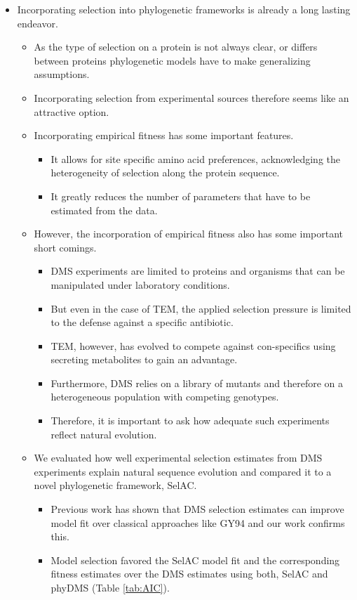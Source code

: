 \documentclass[12pt]{article}
\begin{document}
\begin{itemize}
	\item Incorporating selection into phylogenetic frameworks is already a long lasting endeavor.
	\begin{itemize}
		\item As the type of selection on a protein is not always clear, or differs between proteins phylogenetic models have to make generalizing assumptions.
		\item Incorporating selection from experimental sources therefore seems like an attractive option.
		\item Incorporating empirical fitness has some important features.
		\begin{itemize}
			\item It allows for site specific amino acid preferences, acknowledging the heterogeneity of selection along the protein sequence.
			\item It greatly reduces the number of parameters that have to be estimated from the data.
		\end{itemize}
		\item However, the incorporation of empirical fitness also has some important short comings.
		\begin{itemize}
			\item DMS experiments are limited to proteins and organisms that can be manipulated under laboratory conditions.
			\item But even in the case of TEM, the applied selection pressure is limited to the defense against a specific antibiotic.
			\item TEM, however, has evolved to compete against con-specifics using secreting metabolites to gain an advantage.
			\item Furthermore, DMS relies on a library of mutants and therefore on a heterogeneous population with competing genotypes.
			\item Therefore, it is important to ask how adequate such experiments reflect natural evolution. 
		\end{itemize}
		\item We evaluated how well experimental selection estimates from DMS experiments explain natural sequence evolution and compared it to a novel phylogenetic framework, SelAC.
		\begin{itemize}
			\item Previous work has shown that DMS selection estimates can improve model fit over classical approaches like GY94 and our work confirms this.
			\item Model selection favored the SelAC model fit and the corresponding fitness estimates over the DMS estimates using both, SelAC and phyDMS (Table \ref{tab:AIC}).
		\end{itemize}
	\end{itemize}


\end{itemize}
\end{document}
